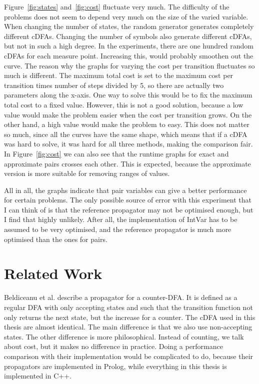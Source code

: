 \documentclass[a4paper,11pt]{article}
\begin{document}
Figure~\ref{fig:states} and~\ref{fig:cost} fluctuate very much. The difficulty of the problems does not seem to depend very much on the size of the varied variable. When changing the number of states, the random generator generates completely different cDFAs. Changing the number of symbols also generate different cDFAs, but not in such a high degree. In the experiments, there are one hundred random cDFAs for each measure point. Increasing this, would probably smoothen out the curve. The reason why the graphs for varying the cost per transition fluctuates so much is different. The maximum total cost is set to the maximum cost per transition times number of steps divided by 5, so there are actually two parameters along the x-axis. One way to solve this would be to fix the maximum total cost to a fixed value. However, this is not a good solution, because a low value would make the problem easier when the cost per transition grows. On the other hand, a high value would make the problem to easy. This does not matter so much, since all the curves have the same shape, which means that if a cDFA was hard to solve, it was hard for all three methods, making the comparison fair. In Figure~\ref{fig:cost} we can also see that the runtime graphs for exact and approximate pairs crosses each other. This is expected, because the approximate version is more suitable for removing ranges of values.

All in all, the graphs indicate that pair variables can give a better performance for certain problems. The only possible source of error with this experiment that I can think of is that the reference propagator may not be optimised enough, but I find that highly unlikely. After all, the implementation of IntVar has to be assumed to be very optimised, and the reference propagator is much more optimised than the ones for pairs.

\section{Related Work}
Beldiceanu et al. \cite{Beldiceanu675954} describe a propagator for a counter-DFA. It is defined as a regular DFA with only accepting states and such that the transition function not only returns the next state, but the increase for a counter. The cDFA used in this thesis are almost identical. The main difference is that we also use non-accepting states. The other difference is more philosophical. Instead of counting, we talk about cost, but it makes no difference in practice. Doing a performance comparison with their implementation would be complicated to do, because their propagators are implemented in Prolog, while everything in this thesis is implemented in C++.
\end{document}
